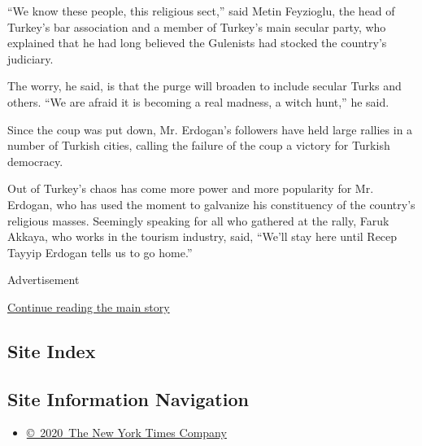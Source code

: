 ``We know these people, this religious sect,'' said Metin Feyzioglu, the
head of Turkey's bar association and a member of Turkey's main secular
party, who explained that he had long believed the Gulenists had stocked
the country's judiciary.

The worry, he said, is that the purge will broaden to include secular
Turks and others. ``We are afraid it is becoming a real madness, a witch
hunt,'' he said.

Since the coup was put down, Mr. Erdogan's followers have held large
rallies in a number of Turkish cities, calling the failure of the coup a
victory for Turkish democracy.

Out of Turkey's chaos has come more power and more popularity for Mr.
Erdogan, who has used the moment to galvanize his constituency of the
country's religious masses. Seemingly speaking for all who gathered at
the rally, Faruk Akkaya, who works in the tourism industry, said,
``We'll stay here until Recep Tayyip Erdogan tells us to go home.''

Advertisement

\protect\hyperlink{after-bottom}{Continue reading the main story}

\hypertarget{site-index}{%
\subsection{Site Index}\label{site-index}}

\hypertarget{site-information-navigation}{%
\subsection{Site Information
Navigation}\label{site-information-navigation}}

\begin{itemize}
\tightlist
\item
  \href{https://help.nytimes3xbfgragh.onion/hc/en-us/articles/115014792127-Copyright-notice}{©~2020~The
  New York Times Company}
\end{itemize}

